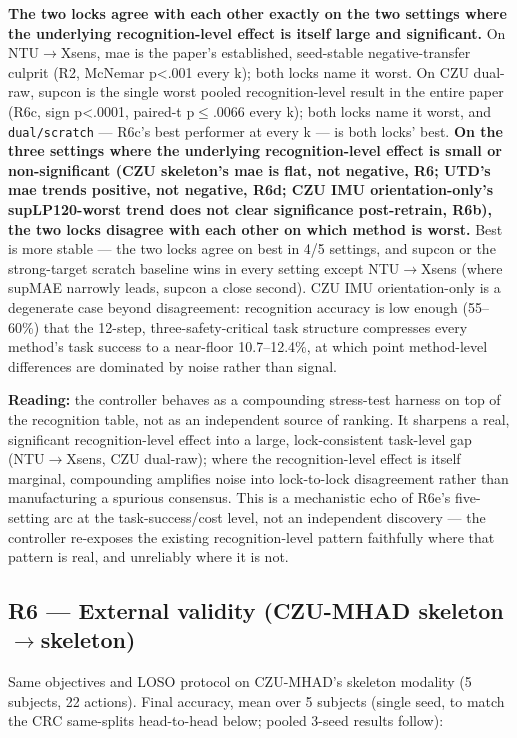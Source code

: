 \textbf{The two locks agree with each other exactly on the two settings where the underlying recognition-level effect is itself large and significant.} On NTU$\rightarrow$Xsens, mae is the paper's established, seed-stable negative-transfer culprit (R2, McNemar p<.001 every k); both locks name it worst. On CZU dual-raw, supcon is the single worst pooled recognition-level result in the entire paper (R6c, sign p<.0001, paired-t p$\le$.0066 every k); both locks name it worst, and \texttt{dual/scratch} --- R6c's best performer at every k --- is both locks' best. \textbf{On the three settings where the underlying recognition-level effect is small or non-significant (CZU skeleton's mae is flat, not negative, R6; UTD's mae trends positive, not negative, R6d; CZU IMU orientation-only's supLP120-worst trend does not clear significance post-retrain, R6b), the two locks disagree with each other on which method is worst.} Best is more stable --- the two locks agree on best in 4/5 settings, and supcon or the strong-target scratch baseline wins in every setting except NTU$\rightarrow$Xsens (where supMAE narrowly leads, supcon a close second). CZU IMU orientation-only is a degenerate case beyond disagreement: recognition accuracy is low enough (55--60\%) that the 12-step, three-safety-critical task structure compresses every method's task success to a near-floor 10.7--12.4\%, at which point method-level differences are dominated by noise rather than signal.

\textbf{Reading:} the controller behaves as a compounding stress-test harness on top of the recognition table, not as an independent source of ranking. It sharpens a real, significant recognition-level effect into a large, lock-consistent task-level gap (NTU$\rightarrow$Xsens, CZU dual-raw); where the recognition-level effect is itself marginal, compounding amplifies noise into lock-to-lock disagreement rather than manufacturing a spurious consensus. This is a mechanistic echo of R6e's five-setting arc at the task-success/cost level, not an independent discovery --- the controller re-exposes the existing recognition-level pattern faithfully where that pattern is real, and unreliably where it is not.

\subsection{R6 --- External validity (CZU-MHAD skeleton$\rightarrow$skeleton)}

Same objectives and LOSO protocol on CZU-MHAD's skeleton modality (5 subjects, 22 actions). Final accuracy, mean over 5 subjects (single seed, to match the CRC same-splits head-to-head below; pooled 3-seed results follow):

